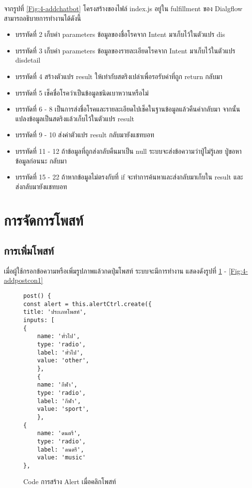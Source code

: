 จากรูปที่ \ref{Fig:4-addchatbot} โครงสร้างของไฟล์ index.js อยู่ใน fulfillment ของ Dialgflow สามารถอธิบายการทำงานได้ดังนี้
\begin{itemize}[label={--}]
\item บรรทัดที่ 2 เก็บค่า parameters ข้อมูลของชื่อโรคจาก Intent มาเก็บไว้ในตัวแปร dis
\item บรรทัดที่ 3 เก็บค่า parameters ข้อมูลของรายละเอียดโรคจาก Intent มาเก็บไว้ในตัวแปร disdetail
\item บรรทัดที่ 4 สร้างตัวแปร result ให้เท่ากับสตริงเปล่าเพื่อรอรับค่าที่ถูก return กลับมา
\item บรรทัดที่ 5 เช็คชื่อโรคว่าเป็นข้อมูลชนิดเบาหวานหรือไม่
\item บรรทัดที่ 6 - 8 เป็นการส่งชื่อโรคและรายละเอียดไปเช็คในฐานข้อมูลแล้วคืนค่ากลับมา จากนั้นแปลงข้อมูลเป็นสตริงแล้วเก็บไว้ในตัวแปร result
\item บรรทัดที่ 9 - 10 ส่งค่าตัวแปร result กลับมายังแชทบอท
\item บรรทัดที่ 11 - 12 ถ้าข้อมูลที่ถูกส่งกลับคืนมาเป็น null ระบบจะส่งข้อความว่าปู่ไม่รู้เลย ปู่ขอหาข้อมูลก่อนนะ กลับมา
\item บรรทัดที่ 15 - 22 ถ้าหากข้อมูลไม่ตรงกับที่ if จะทำการค้นหาและส่งกลับมาเก็บใน result และส่งกลับมายังแชทบอท
\end{itemize}
\newpage


\section{การจัดการโพสท์}

\subsection{การเพิ่มโพสท์}
เมื่อผู้ใช้กรอกข้อความหรือเพิ่มรูปภาพแล้วกดปุ่มโพสท์ ระบบจะมีการทำงาน แสดงดังรูปที่ \ref{Fig:4-addpost} - \ref{Fig:4-addpostcon1}

\begin{figure}[H]
{\lstset{language=Pascal}
\begin{lstlisting}
post() {
const alert = this.alertCtrl.create({
title: 'ประเภทโพสท์',
inputs: [
{
	name: 'ทั่วไป',
	type: 'radio',
	label: 'ทั่วไป',
	value: 'other',
	},
	{
	name: 'กีฬา',
	type: 'radio',
	label: 'กีฬา',
	value: 'sport',
	},
{
	name: 'ดนตรี',
	type: 'radio',
	label: 'ดนตรี',
	value: 'music'
},
\end{lstlisting}}

\caption{Code การสร้าง Alert เมื่อคลิกโพสท์}
\label{Fig:4-addpost}
\end{figure}

